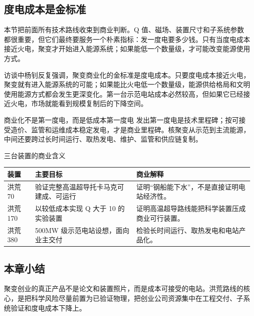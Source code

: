 \subsection{度电成本是金标准}

本节把前面所有技术路线收束到商业判断。Q 值、磁场、装置尺寸和子系统参数都很重要，但它们最终要服务一个朴素指标：发一度电要多少钱。只有当度电成本接近火电，聚变才开始进入能源系统；如果能低一个数量级，才可能改变能源使用方式。

访谈中杨钊反复强调，聚变商业化的金标准是度电成本。只要度电成本接近火电，聚变就有进入能源系统的可能；如果能比火电低一个数量级，能源供给格局和文明使用能源方式都会发生更深变化。第一台示范电站成本必然较高，但如果它已经接近火电，市场就能看到规模复制后的下降空间。

\begin{importantbox}{商业化不是第一度电，而是低成本第一度电}
发出第一度电是技术里程碑；按可接受造价、监管和运维成本稳定发电，才是商业里程碑。核聚变从示范到主流能源，中间还要跨过长时间运行、取热发电、维护、监管和供应链复制。
\end{importantbox}

\begin{knowledgebox}{三台装置的商业含义}
\begin{tabularx}{\textwidth}{p{}p{}X}
\toprule
装置 & 主要目标 & 商业解释 \\
\midrule
洪荒 70 & 验证完整高温超导托卡马克可建成、可运行 & 证明“钢船能下水”，不是直接证明电站经济性。 \\
洪荒 170 & 以较低成本实现 Q 大于 10 的实验装置 & 证明高温超导路线能把科学装置压成商业可行装置。 \\
洪荒 380 & 500MW 级示范电站设想，面向业主交付 & 检验长时间运行、取热发电和电站产品化。 \\
\bottomrule
\end{tabularx}
\end{knowledgebox}

\subsection{本章小结}

聚变创业的真正产品不是论文和装置照片，而是成本可接受的电站。洪荒路线的核心，是把科学风险尽量前置为已验证物理，把创业公司资源集中在工程交付、子系统验证和度电成本下降上。

